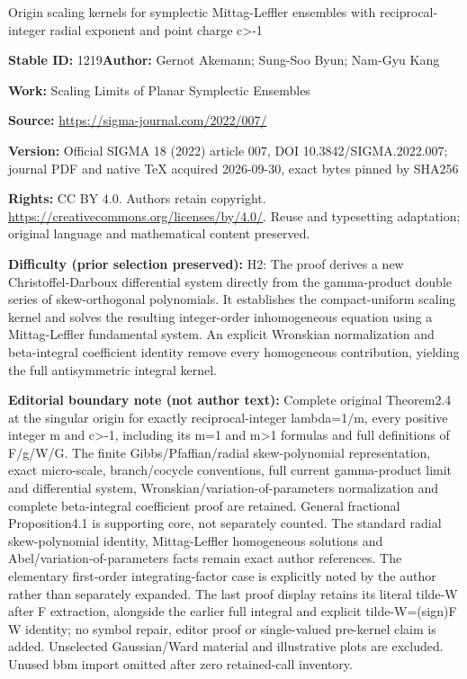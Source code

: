 \documentclass[11pt]{article}
\numberwithin{equation}{section}
\numberwithin{equation}{section}
\newcommand{\1}{\chi}
\begin{document}
\begin{center}\Large Origin scaling kernels for symplectic Mittag-Leffler ensembles with reciprocal-integer radial exponent and point charge c>-1\end{center}
\noindent\textbf{Stable ID:} 1219\quad\textbf{Author:} Gernot Akemann; Sung-Soo Byun; Nam-Gyu Kang\par
\noindent\textbf{Work:} Scaling Limits of Planar Symplectic Ensembles\par
\noindent\textbf{Source:} \url{https://sigma-journal.com/2022/007/}\par
\noindent\textbf{Version:} Official SIGMA 18 (2022) article 007, DOI 10.3842/SIGMA.2022.007; journal PDF and native TeX acquired 2026-09-30, exact bytes pinned by SHA256\par
\noindent\textbf{Rights:} CC BY 4.0. Authors retain copyright. \url{https://creativecommons.org/licenses/by/4.0/}. Reuse and typesetting adaptation; original language and mathematical content preserved.\par
\noindent\textbf{Difficulty (prior selection preserved):} {\CJKfont H2: The proof derives a new Christoffel-Darboux differential system directly from the gamma-product double series of skew-orthogonal polynomials. It establishes the compact-uniform scaling kernel and solves the resulting integer-order inhomogeneous equation using a Mittag-Leffler fundamental system. An explicit Wronskian normalization and beta-integral coefficient identity remove every homogeneous contribution, yielding the full antisymmetric integral kernel.}\par
\medskip\noindent\textbf{Editorial boundary note (not author text):} Complete original Theorem2.4 at the singular origin for exactly reciprocal-integer lambda=1/m, every positive integer m and c>-1, including its m=1 and m>1 formulas and full definitions of F/g/W/G. The finite Gibbs/Pfaffian/radial skew-polynomial representation, exact micro-scale, branch/cocycle conventions, full current gamma-product limit and differential system, Wronskian/variation-of-parameters normalization and complete beta-integral coefficient proof are retained. General fractional Proposition4.1 is supporting core, not separately counted. The standard radial skew-polynomial identity, Mittag-Leffler homogeneous solutions and Abel/variation-of-parameters facts remain exact author references. The elementary first-order integrating-factor case is explicitly noted by the author rather than separately expanded. The last proof display retains its literal tilde-W after F extraction, alongside the earlier full integral and explicit tilde-W=(sign)F W identity; no symbol repair, editor proof or single-valued pre-kernel claim is added. Unselected Gaussian/Ward material and illustrative plots are excluded. Unused bbm import omitted after zero retained-call inventory.\par
\end{document}
